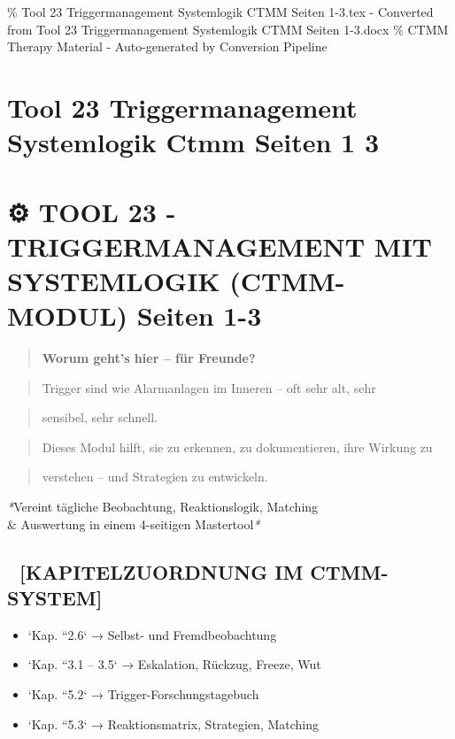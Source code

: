 \% Tool 23 Triggermanagement Systemlogik CTMM Seiten 1-3.tex - Converted from Tool 23 Triggermanagement Systemlogik CTMM Seiten 1-3.docx
\% CTMM Therapy Material - Auto-generated by Conversion Pipeline

\section{Tool 23 Triggermanagement Systemlogik Ctmm Seiten 1 3}
\label{sec:tool-23-triggermanagement-systemlogik-ctmm-seiten-1-3}

\section{⚙️ \textbf{TOOL 23 - TRIGGERMANAGEMENT MIT SYSTEMLOGIK (\textcolor{ctmmBlue}{CTMM}-MODUL) Seiten 1-3}}

\begin{quote}
\textcolor{ctmmPurple}{} \textbf{Worum geht's hier -- für Freunde?}\
\end{quote}
\begin{quote}
\textcolor{ctmmRed}{Trigger} sind wie Alarmanlagen im Inneren -- oft sehr alt, sehr
\end{quote}
\begin{quote}
sensibel, sehr schnell.\
\end{quote}
\begin{quote}
Dieses Modul hilft, sie zu erkennen, zu dokumentieren, ihre Wirkung zu
\end{quote}
\begin{quote}
verstehen -- und Strategien zu entwickeln.
\end{quote}

\textcolor{ctmmBlue}{} \textit{*}Vereint tägliche Beobachtung, Reaktionslogik, Matching \\&
Auswertung in einem 4-seitigen Mastertool\textit{*}

\subsection{📘 \textbf{[KAPITELZUORDNUNG IM \textcolor{ctmmBlue}{CTMM}-SYSTEM]}}

\begin{itemize}
\item   `Kap. ``2.6` → Selbst- und Fremdbeobachtung
\item   `Kap. ``3.1 -- 3.5` → Eskalation, Rückzug, Freeze, Wut
\item   `Kap. ``5.2` → Trigger-Forschungstagebuch
\item   `Kap. ``5.3` → Reaktionsmatrix, Strategien, Matching
\end{itemize}

